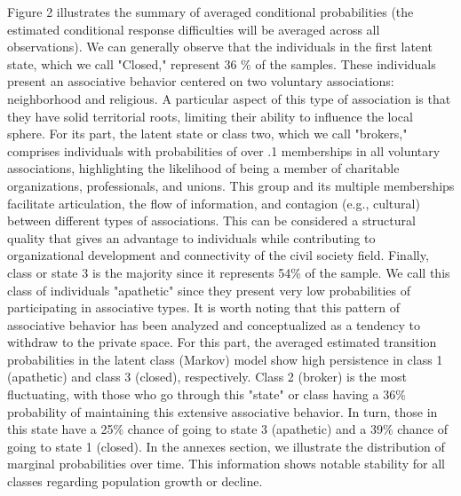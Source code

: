 Figure 2 illustrates the summary of averaged conditional probabilities (the estimated conditional response difficulties will be averaged across all observations). We can generally observe that the individuals in the first latent state, which we call "Closed," represent 36 \% of the samples. These individuals present an associative behavior centered on two voluntary associations: neighborhood and religious. A particular aspect of this type of association is that they have solid territorial roots, limiting their ability to influence the local sphere. For its part, the latent state or class two, which we call "brokers," comprises individuals with probabilities of over .1 memberships in all voluntary associations, highlighting the likelihood of being a member of charitable organizations, professionals, and unions. This group and its multiple memberships facilitate articulation, the flow of information, and contagion (e.g., cultural) between different types of associations. This can be considered a structural quality that gives an advantage to individuals while contributing to organizational development and connectivity of the civil society field. Finally, class or state 3 is the majority since it represents 54\% of the sample. We call this class of individuals "apathetic" since they present very low probabilities of participating in associative types. It is worth noting that this pattern of associative behavior has been analyzed and conceptualized as a tendency to withdraw to the private space. For this part, the averaged estimated transition probabilities in the latent class (Markov) model show high persistence in class 1 (apathetic) and class 3 (closed), respectively. Class 2 (broker) is the most fluctuating, with those who go through this "state" or class having a 36\% probability of maintaining this extensive associative behavior. In turn, those in this state have a 25\% chance of going to state 3 (apathetic) and a 39\% chance of going to state 1 (closed). In the annexes section, we illustrate the distribution of marginal probabilities over time. This information shows notable stability for all classes regarding population growth or decline.
\bigskip


